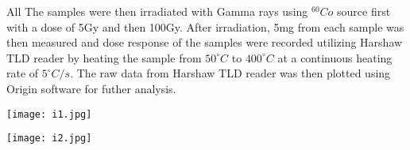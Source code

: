 \documentclass[../experiment.tex]{subfiles}
\begin{document}
    All The samples were then irradiated with Gamma rays using $^{60}Co$ source first with a
    dose of 5Gy and then 100Gy. After irradiation, 5mg from each sample was then measured and dose response of the 
    samples were recorded utilizing Harshaw TLD reader by heating the sample from $50^{\circ}C$ to $400^{\circ}C$ 
    at a continuous heating rate of $5^{\circ}C/s$. The raw data from Harshaw TLD reader was then plotted using
    Origin software for futher analysis.
    \FloatBarrier\begin{multicols}{2}
        \begin{Figure}
            \centering
            \texttt{[image: i1.jpg]}
            \label{fig:i1}
        \end{Figure}
        \begin{Figure}
            \centering
            \texttt{[image: i2.jpg]}
            \label{fig:i2}
        \end{Figure}
    \end{multicols}
\end{document}
